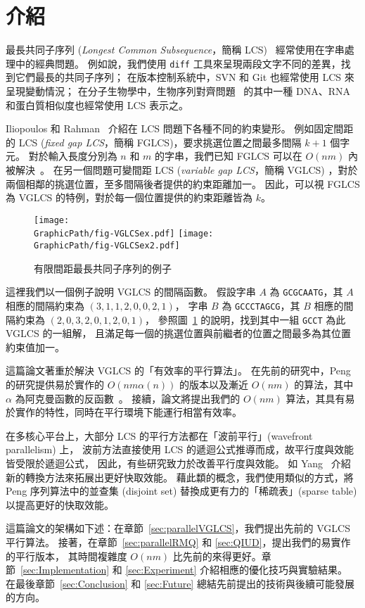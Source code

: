\section{介紹} %
\label{sec:Introduction}

最長共同子序列 ({\em Longest Common Subsequence}，簡稱 LCS)~
\cite{Hirschberg1975ALS} 經常使用在字串處理中的經典問題。
例如說，我們使用 {\tt diff} 工具來呈現兩段文字不同的差異，找到它們最長的共同子序列；
在版本控制系統中，SVN 和 Git 也經常使用 LCS 來呈現變動情況；
在分子生物學中，生物序列對齊問題~\cite{mount2001bioinformatics,
Ann2010EfficientAF} 的其中一種 DNA、RNA 和蛋白質相似度也經常使用 LCS 表示之。

Iliopoulos 和 Rahman~\cite{Rahman2006AlgorithmsFC} 介紹在 LCS 問題下各種不同的約束變形。
例如固定間距的 LCS ({\em fixed gap LCS}，簡稱 FGLCS)，要求挑選位置之間最多間隔 $k+1$ 個字元。
對於輸入長度分別為 $n$ 和 $m$ 的字串，我們已知 FGLCS 可以在 $O(nm)$ 內被解決~\cite{Rahman2006AlgorithmsFC}。
在另一個問題可變間距 LCS ({\em variable gap LCS}，簡稱 VGLCS)
，對於兩個相鄰的挑選位置，至多間隔後者提供的約束距離加一。
因此，可以視 FGLCS 為 VGLCS 的特例，對於每一個位置提供的約束距離皆為 $k$。

\begin{figure}[!thb]
  \centering
  \texttt{[image: \\GraphicPath/fig-VGLCSex.pdf]}
  \texttt{[image: \\GraphicPath/fig-VGLCSex2.pdf]}
  \caption{有限間距最長共同子序列的例子} \label{fig:VGLCSex}
\end{figure}

這裡我們以一個例子說明 VGLCS 的間隔函數。
假設字串 $A$ 為 {\tt GCGCAATG}，其 $A$ 相應的間隔約束為 $(3,1,1,2,0,0,2,1)$，
字串 $B$ 為 {\tt GCCCTAGCG}，其 $B$ 相應的間隔約束為 $(2,0,3,2,0,1,2,0,1)$，
參照圖~\ref{fig:VGLCSex} 的說明，找到其中一組 {\tt GCCT} 為此 VGLCS 的一組解，
且滿足每一個的挑選位置與前繼者的位置之間最多為其位置約束值加一。

這篇論文著重於解決 VGLCS 的「有效率的平行算法」。
在先前的研究中，Peng~\cite{Peng2011TheLC} 的研究提供易於實作的 $O(nm \alpha(n))$ 
的版本以及漸近 $O(nm)$ 的算法，其中 $\alpha$ 為阿克曼函數的反函數~\cite{Banachowski1980ACT}。
接續，論文將提出我們的 $O(nm)$ 算法，其具有易於實作的特性，同時在平行環境下能運行相當有效率。


在多核心平台上，大部分 LCS 的平行方法都在「波前平行」(wavefront parallelism) 上，
波前方法直接使用 LCS 的遞迴公式推導而成，故平行度與效能皆受限於遞迴公式，
因此，有些研究致力於改善平行度與效能。
如 Yang~\cite{Yang2010AnEP} 介紹新的轉換方法來拓展出更好快取效能。
藉此纇的概念，我們使用類似的方式，將 Peng 序列算法中的並查集 (disjoint set) 
替換成更有力的「稀疏表」(sparse table) 以提高更好的快取效能。

這篇論文的架構如下述：在章節~\ref{sec:parallelVGLCS}，我們提出先前的 VGLCS 平行算法。
接著，在章節~\ref{sec:parallelRMQ} 和 \ref{sec:QIUD}，提出我們的易實作的平行版本，
其時間複雜度 $O(nm)$ 比先前的來得更好。章節~\ref{sec:Implementation} 和
 \ref{sec:Experiment} 介紹相應的優化技巧與實驗結果。
 在最後章節~\ref{sec:Conclusion} 和 \ref{sec:Future} 總結先前提出的技術與後續可能發展的方向。

